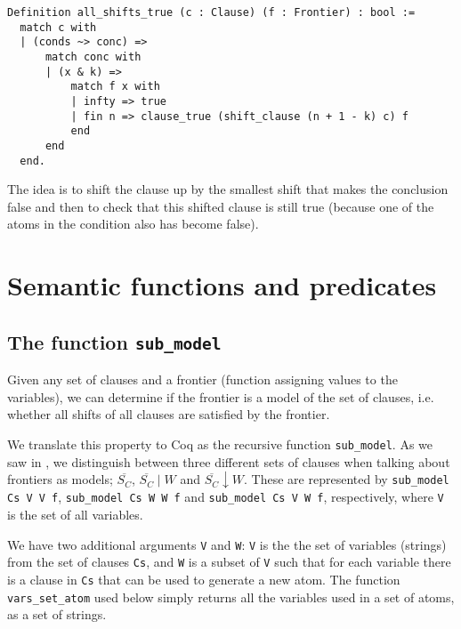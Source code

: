 \begin{minipage}{\linewidth}
\begin{lstlisting}[language=Coq, label={lst:all_shifts_true}, caption={\lstinline{all_shifts_true} in Coq}]
Definition all_shifts_true (c : Clause) (f : Frontier) : bool :=
  match c with
  | (conds ~> conc) =>
      match conc with
      | (x & k) =>
          match f x with
          | infty => true
          | fin n => clause_true (shift_clause (n + 1 - k) c) f
          end
      end
  end.
\end{lstlisting}
\end{minipage}

The idea is to shift the clause up by the smallest shift that makes the conclusion false
and then to check that this shifted clause is still true
(because one of the atoms in the condition also has become false).

\section{Semantic functions and predicates}

\subsection{The function \lstinline{sub_model}}

Given any set of clauses and a frontier (function assigning values to the variables),
we can determine if the frontier is a model of the set of clauses, i.e.
whether all shifts of all clauses are satisfied by the frontier.

We translate this property to Coq as the recursive function \lstinline{sub_model}.
As we saw in , we distinguish
between three different sets of clauses when talking about frontiers as models;
$\overline{S_C}$, $\overline{S_C}\mid W$ and $\overline{S_C}\downarrow W$.
These are represented by
\lstinline{sub_model Cs V V f}, \lstinline{sub_model Cs W W f} and \lstinline{sub_model Cs V W f},
respectively, where \lstinline{V} is the set of all variables.

We have two additional arguments \lstinline{V} and \lstinline{W}:
\lstinline{V} is the the set of variables (strings) from the set of clauses \lstinline{Cs},
and \lstinline{W} is a subset of \lstinline{V} such that for each variable
there is a clause in \lstinline{Cs} that can be used to generate a new atom.
The function \lstinline{vars_set_atom} used below simply returns all the variables
used in a set of atoms, as a set of strings.

